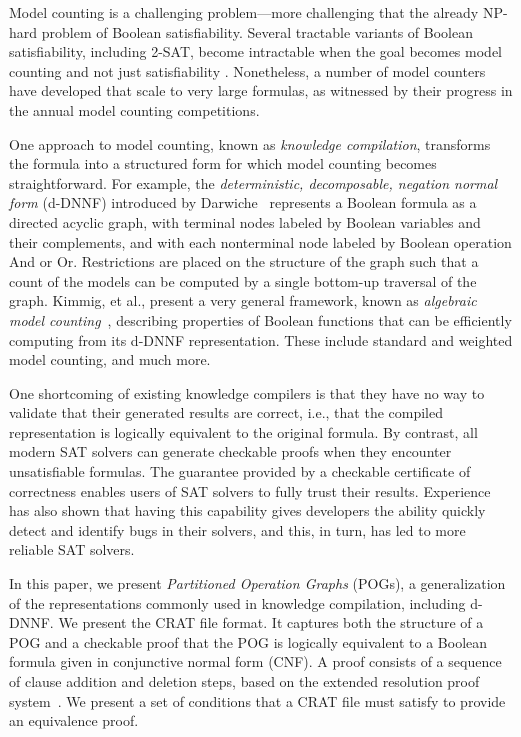 \documentclass[letterpaper,USenglish,cleveref, autoref, thm-restate]{lipics-v2021}
\begin{document}
Model counting is a challenging problem---more challenging that the
already NP-hard problem of Boolean satisfiability.  Several
tractable variants of Boolean satisfiability, including 2-SAT, become
intractable when the goal becomes model counting and not just
satisfiability \cite{valiant:siam:1979}.  Nonetheless, a number of
model counters have developed that scale to very large formulas, as
witnessed by their progress in the annual model counting competitions.

One approach to model counting, known as {\em knowledge compilation},
transforms the formula into a structured form for which model counting
becomes straightforward.  For example, the {\em deterministic,
  decomposable, negation normal form} (d-DNNF) introduced by
Darwiche~\cite{darwiche:aaai:2002,darwiche:ecai:2004} represents a
Boolean formula as a directed acyclic graph, with terminal nodes
labeled by Boolean variables and their complements, and with each
nonterminal node labeled by Boolean operation And or Or.  Restrictions
are placed on the structure of the graph such that a count of the
models can be computed by a single bottom-up traversal of the graph.
Kimmig, et al., present a very general framework, known as {\em
  algebraic model counting}~\cite{kimmig:jal:2017}, describing
properties of Boolean functions that can be efficiently computing from
its d-DNNF representation.  These include standard and weighted model
counting, and much more.

One shortcoming of existing knowledge compilers is that they have no
way to validate that their generated results are correct, i.e., that
the compiled representation is logically equivalent to the original
formula.  By contrast, all modern SAT solvers can generate
checkable proofs when they encounter unsatisfiable formulas.  The
guarantee provided by a checkable certificate of correctness enables
users of SAT solvers to fully trust their results.  Experience has also
shown that having this capability gives developers the ability quickly
detect and identify bugs in their solvers, and this, in turn, has led
to more reliable SAT solvers.

In this paper, we present \emph{Partitioned Operation Graphs} (POGs),
a generalization of the representations commonly used in knowledge
compilation, including d-DNNF\@.  We present the CRAT file format.
It captures both the structure of a POG and a checkable proof
that the POG is logically equivalent to a Boolean formula given in
conjunctive normal form (CNF).  A proof consists of a sequence of
clause addition and deletion steps, based on the extended resolution
proof system~\cite{Tseitin:1983}.  We present a set of conditions that
a CRAT file must satisfy to provide an equivalence proof.
\end{document}
